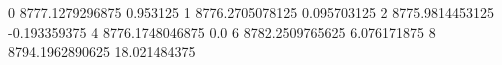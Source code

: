 0 8777.1279296875 0.953125
1 8776.2705078125 0.095703125
2 8775.9814453125 -0.193359375
4 8776.1748046875 0.0
6 8782.2509765625 6.076171875
8 8794.1962890625 18.021484375
